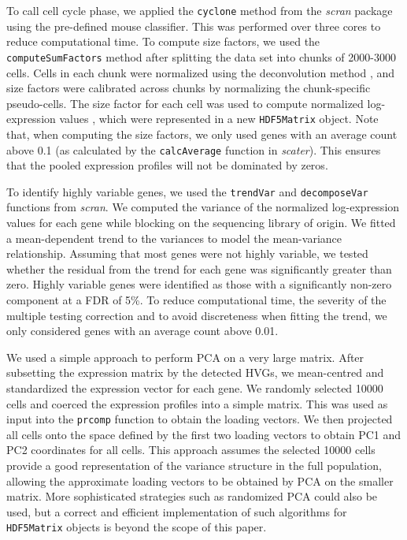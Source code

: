 \documentclass[10pt,letterpaper]{article}
\newcommand{\code}[1]{\texttt{#1}}
\begin{document}
To call cell cycle phase, we applied the \code{cyclone} method \cite{scialdone2015computational} from the \textit{scran} package using the pre-defined mouse classifier.
This was performed over three cores to reduce computational time.
To compute size factors, we used the \code{computeSumFactors} method after splitting the data set into chunks of 2000-3000 cells.
Cells in each chunk were normalized using the deconvolution method \cite{lun2016pooling}, and size factors were calibrated across chunks by normalizing the chunk-specific pseudo-cells.
The size factor for each cell was used to compute normalized log-expression values \cite{lun2016stepbystep}, which were represented in a new \code{HDF5Matrix} object.
Note that, when computing the size factors, we only used genes with an average count above 0.1 (as calculated by the \code{calcAverage} function in \textit{scater}).
This ensures that the pooled expression profiles will not be dominated by zeros.

To identify highly variable genes, we used the \code{trendVar} and \code{decomposeVar} functions from \textit{scran}.
We computed the variance of the normalized log-expression values for each gene while blocking on the sequencing library of origin.
We fitted a mean-dependent trend to the variances to model the mean-variance relationship.
Assuming that most genes were not highly variable, we tested whether the residual from the trend for each gene was significantly greater than zero.
Highly variable genes were identified as those with a significantly non-zero component at a FDR of 5\%.
To reduce computational time, the severity of the multiple testing correction and to avoid discreteness when fitting the trend, we only considered genes with an average count above 0.01.

We used a simple approach to perform PCA on a very large matrix.
After subsetting the expression matrix by the detected HVGs, we mean-centred and standardized the expression vector for each gene.
We randomly selected 10000 cells and coerced the expression profiles into a simple matrix.
This was used as input into the \code{prcomp} function to obtain the loading vectors.
We then projected all cells onto the space defined by the first two loading vectors to obtain PC1 and PC2 coordinates for all cells.
This approach assumes the selected 10000 cells provide a good representation of the variance structure in the full population, allowing the approximate loading vectors to be obtained by PCA on the smaller matrix.
More sophisticated strategies such as randomized PCA \cite{halko2011finding} could also be used, but a correct and efficient implementation of such algorithms for \code{HDF5Matrix} objects is beyond the scope of this paper.
\end{document}
